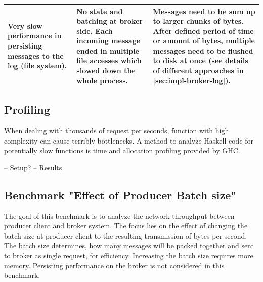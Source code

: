 \begin{table}[H]
\begin{tabular}{|p{4cm}|p{5cm}|p{6cm}|}
Very slow performance in persisting messages to the log (file system).                                 & No state and batching at broker side. Each incoming message ended in multiple file accesses which slowed down the whole process.                                                                                                                                & Messages need to be sum up to larger chunks of bytes. After defined period of time or amount of bytes, multiple messages need to be flushed to disk at once (see details of different approaches in \ref{sec:impl-broker-log}).                                                                                                                                      \\ \hline
\end{tabular}
\end{table}


\subsection{Profiling}
When dealing with thousands of request per seconds, function with high complexity
can cause terribly bottlenecks. A method to analyze Haskell code for
potentially slow functions is time and allocation profiling provided by GHC.

-- Setup?
-- Results 

\subsection{Benchmark "Effect of Producer Batch size"}
The goal of this benchmark is to analyze the network throughput between
producer client and broker system.  The focus lies on the effect of changing
the batch size at producer client to the resulting transmission of bytes per
second. The batch size determines, how many messages will be packed together
and sent to broker as single request, for efficiency. Increasing the batch size
requires more memory. Persisting performance on the broker is not considered in
this benchmark. 

